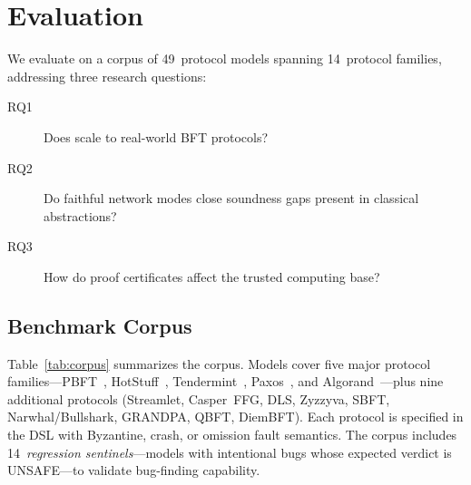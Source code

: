 \section{Evaluation}\label{sec:evaluation}

We evaluate \tarsier{} on a corpus of 49~protocol models spanning
14~protocol families, addressing three research questions:
\begin{description}
  \item[RQ1] Does \tarsier{} scale to real-world BFT protocols?
  \item[RQ2] Do faithful network modes close soundness gaps present
    in classical abstractions?
  \item[RQ3] How do proof certificates affect the trusted computing
    base?
\end{description}

\subsection{Benchmark Corpus}

Table~\ref{tab:corpus} summarizes the corpus.  Models cover five major
protocol families---PBFT~\cite{CastroLiskov1999},
HotStuff~\cite{YinMGRGA2019}, Tendermint~\cite{BuchmanKM2018},
Paxos~\cite{Lamport1998}, and Algorand~\cite{GiladHMVZ2017}---plus nine
additional protocols (Streamlet, Casper~FFG, DLS, Zyzzyva, SBFT,
Narwhal/Bullshark, GRANDPA, QBFT, DiemBFT).  Each protocol is specified
in the \tarsier{} DSL with Byzantine, crash, or omission fault
semantics.  The corpus includes 14~\emph{regression sentinels}---models
with intentional bugs whose expected verdict is UNSAFE---to validate
bug-finding capability.


